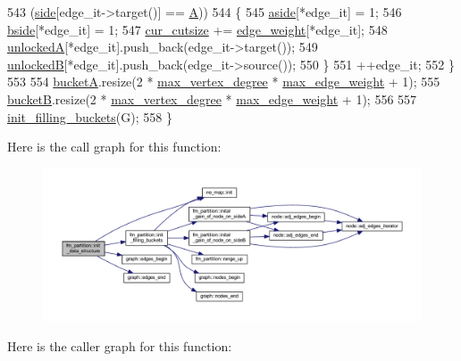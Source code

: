 \begin{DoxyCode}
543         (\mbox{\hyperlink{classfm__partition_af83309e781e9658fc0ff923ced087bfc}{side}}[edge\_it->target()] == \mbox{\hyperlink{classfm__partition_a738e75c601403754e61e6dac623fd3ab}{A}}))
544     \{
545         \mbox{\hyperlink{classfm__partition_a14b0aa9a91a6e7fa3035669cf5056275}{aside}}[*edge\_it] = 1;
546         \mbox{\hyperlink{classfm__partition_aa75765887173fb06b076b6cae12d4e66}{bside}}[*edge\_it] = 1;
547         \mbox{\hyperlink{classfm__partition_abc8f24c354d2a15f8ec8ef9a46252c93}{cur\_cutsize}} += \mbox{\hyperlink{classfm__partition_adfe6147ba3f9c785f613b472f950595f}{edge\_weight}}[*edge\_it];
548         \mbox{\hyperlink{classfm__partition_a9d75a1d63f711a0c66ae7f5bc181cd8b}{unlockedA}}[*edge\_it].push\_back(edge\_it->target());
549         \mbox{\hyperlink{classfm__partition_a74865bf3e6b6f73350c43c3ad9dfda96}{unlockedB}}[*edge\_it].push\_back(edge\_it->source());
550     \}
551     ++edge\_it;
552     \}
553 
554     \mbox{\hyperlink{classfm__partition_a399955e0c84bad93cb82b5ffe8cf4a04}{bucketA}}.resize(2 * \mbox{\hyperlink{classfm__partition_ab6a4beaa10548ce9f1a0e8e441492ef9}{max\_vertex\_degree}} * 
      \mbox{\hyperlink{classfm__partition_a5b37b4ac8d96236f274a57a46d653e25}{max\_edge\_weight}} + 1);
555     \mbox{\hyperlink{classfm__partition_ae6a5b5f3f2d95ea229882e861ccfc9e4}{bucketB}}.resize(2 * \mbox{\hyperlink{classfm__partition_ab6a4beaa10548ce9f1a0e8e441492ef9}{max\_vertex\_degree}} * 
      \mbox{\hyperlink{classfm__partition_a5b37b4ac8d96236f274a57a46d653e25}{max\_edge\_weight}} + 1);
556 
557     \mbox{\hyperlink{classfm__partition_ac510befe1837c646a260a14c110d7a79}{init\_filling\_buckets}}(G);
558 \}
\end{DoxyCode}
Here is the call graph for this function\+:\nopagebreak
\begin{figure}[H]
\begin{center}
\leavevmode
\includegraphics[width=350pt]{classfm__partition_a9aa27d4c97616c0fdbd00d11dc83bc0b_cgraph}
\end{center}
\end{figure}
Here is the caller graph for this function\+:\nopagebreak
